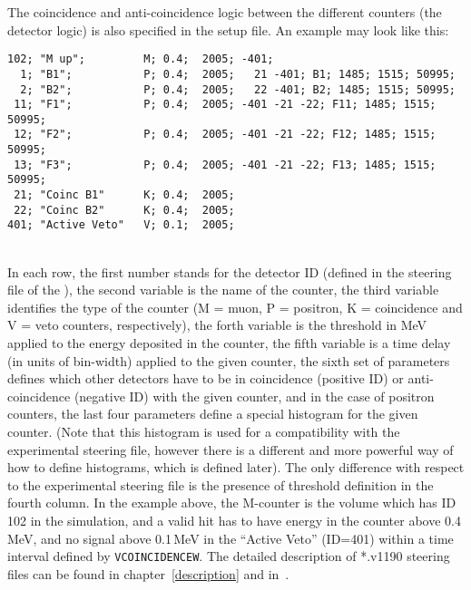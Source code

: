 \documentclass[twoside]{dis04}
\begin{document}
The coincidence and anti-coincidence logic between the different counters
(the detector logic) is also specified in the setup file.
An example may look like this:\\
\begin{verbatim}
102; "M up";         M; 0.4;  2005; -401;
  1; "B1";           P; 0.4;  2005;   21 -401; B1; 1485; 1515; 50995;
  2; "B2";           P; 0.4;  2005;   22 -401; B2; 1485; 1515; 50995;
 11; "F1";           P; 0.4;  2005; -401 -21 -22; F11; 1485; 1515; 50995;
 12; "F2";           P; 0.4;  2005; -401 -21 -22; F12; 1485; 1515; 50995;
 13; "F3";           P; 0.4;  2005; -401 -21 -22; F13; 1485; 1515; 50995;
 21; "Coinc B1"      K; 0.4;  2005;
 22; "Coinc B2"      K; 0.4;  2005;
401; "Active Veto"   V; 0.1;  2005;
\end{verbatim}
\mbox{} \\
%
In each row, the first number stands for the detector ID (defined in the steering file
of the \musrSim), the second variable is the name of the counter,
the third variable identifies the type of the counter (M = muon, P = positron,
K = coincidence and V = veto counters, respectively), the forth variable is the threshold in MeV applied
to the energy deposited in the counter, the fifth variable is a time delay (in units
of bin-width) applied to the given counter, the sixth set of parameters defines
which other detectors have to be in coincidence (positive ID) or anti-coincidence
(negative ID) with the given counter, and in the case of positron counters, the
last four parameters define a special histogram for the given counter. (Note
that this histogram is used for a compatibility with the experimental steering file, however
there is a different and more powerful way of how to define histograms, which is 
defined later). The only difference with respect to the experimental steering
file is the presence of threshold definition in the fourth column.
In the example above, the M-counter is the volume which has ID 102 in the simulation,
and a valid hit has to have energy in the counter above 0.4\,MeV, and no signal
above 0.1\,MeV in the ``Active Veto'' (ID=401) within a time interval defined by 
{\tt VCOINCIDENCEW}.  The detailed description of *.v1190 steering files can be found 
in chapter~\ref{description} and in~\cite{TDCsetup}.
\end{document}
